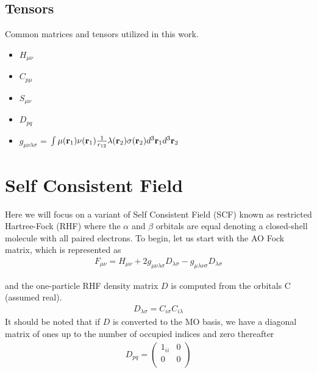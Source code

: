 \documentclass[aip,jcp,preprint,superscriptaddress,floatfix]{revtex4-1}
\begin{document}
\subsection{Tensors}
Common matrices and tensors utilized in this work. 
\begin{itemize} \itemsep1pt \parskip0pt 
\item {}   $H_{\mu\nu}$
\item {}   $C_{p\mu}$
\item {}   $S_{\mu\nu}$
\item {}   $D_{pq}$
\item {}    $g_{\mu\nu\lambda \sigma}$ =  $\int \mu({\bf r}_1) \nu({\bf r}_1)\frac{1}{r_{12}} \lambda({\bf r}_2) \sigma({\bf r}_2)d^3{\bf r}_1d^3{\bf r}_2$
\end{itemize}

\section{Self Consistent Field}
Here we will focus on a variant of Self Consistent Field (SCF) known as restricted Hartree-Fock (RHF) where the $\alpha$ and $\beta$ orbitals are equal denoting a closed-shell molecule with all paired electrons.
To begin, let us start with the AO Fock matrix, which is represented as\cite{Szabo:1996tu, Levine:2000to}
\begin{eqnarray}
\label{rhf_fock}
F_{\mu\nu} = H_{\mu\nu} + 2 g_{\mu \nu \lambda \sigma} D_{\lambda \sigma} -  g_{\mu\lambda \nu \sigma} D_{\lambda \sigma}
\end{eqnarray}

and the one-particle RHF density matrix $D$ is computed from the orbitals C (assumed real).
\begin{eqnarray}
D_{\lambda \sigma} = C_{i\sigma}C_{i\lambda}
\end{eqnarray}
It should be noted that if $D$ is converted to the MO basis, we have a diagonal matrix of ones up to the number of occupied indices and zero thereafter
\begin{align}
D_{pq} = \begin{pmatrix}
1_{ii}& 0 \\
0 &0\\
\end{pmatrix}
\end{align}
\end{document}
